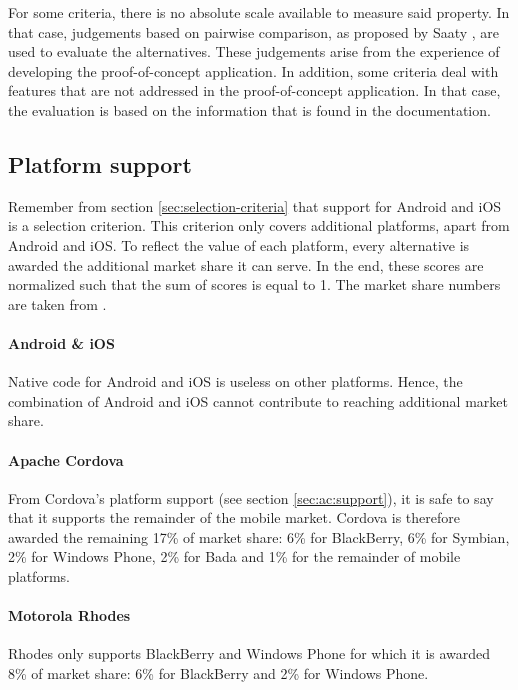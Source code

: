 For some criteria, there is no absolute scale available to measure said property. In that case, judgements based on pairwise comparison, as proposed by Saaty \cite{Saaty:1980}, are used to evaluate the alternatives. These judgements arise from the experience of developing the proof-of-concept application. In addition, some criteria deal with features that are not addressed in the proof-of-concept application. In that case, the evaluation is based on the information that is found in the documentation. 


\subsection{Platform support}

Remember from section \ref{sec:selection-criteria} that support for Android and iOS is a selection criterion. This criterion only covers additional platforms, apart from Android and iOS. To reflect the value of each platform, every alternative is awarded the additional market share it can serve. In the end, these scores are normalized such that the sum of scores is equal to 1. The market share numbers are taken from .

\paragraph{Android \& iOS} Native code for Android and iOS is useless on other platforms. Hence, the combination of Android and iOS cannot contribute to reaching additional market share.

\paragraph{Apache Cordova} From Cordova's platform support (see section \ref{sec:ac:support}), it is safe to say that it supports the remainder of the mobile market. Cordova is therefore awarded the remaining 17\% of market share: 6\% for BlackBerry, 6\% for Symbian, 2\% for Windows Phone, 2\% for Bada and 1\% for the remainder of mobile platforms.

\paragraph{Motorola Rhodes} Rhodes only supports BlackBerry and Windows Phone for which it is awarded 8\% of market share: 6\% for BlackBerry and 2\% for Windows Phone. 

